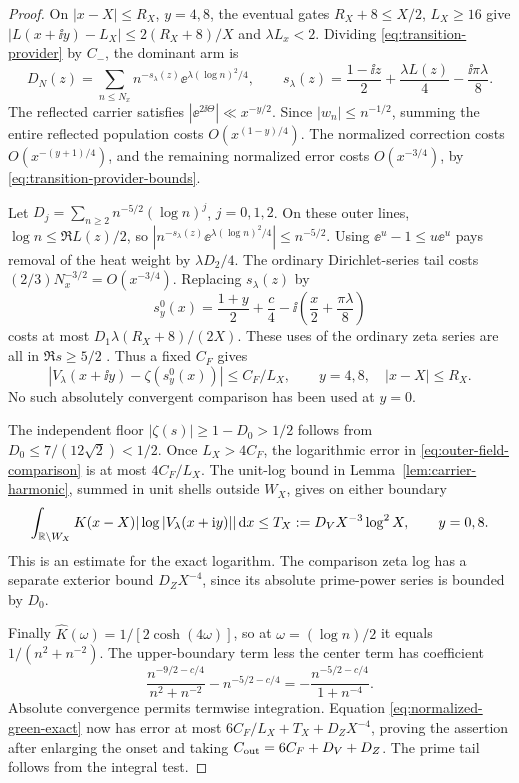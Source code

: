 \begin{proof}
On \(|x-X|\le R_X\), \(y=4,8\), the eventual gates
\(R_X+8\le X/2\), \(L_X\ge16\) give
\(|L(x+\ii y)-L_X|\le2(R_X+8)/X\) and \(\lambda L_x<2\).
Dividing \eqref{eq:transition-provider} by \(C_-\), the dominant arm is
\[
 D_N(z)=\sum_{n\le N_x}n^{-s_\lambda(z)}
                         \ee^{\lambda(\log n)^2/4},\qquad
 s_\lambda(z)=\frac{1-\ii z}{2}+\frac{\lambda L(z)}4
                               -\frac{\ii\pi\lambda}{8}.
\]
The reflected carrier satisfies \(|\ee^{2\ii\Theta}|\ll x^{-y/2}\).
Since \(|w_n|\le n^{-1/2}\), summing the entire reflected population
costs \(O(x^{(1-y)/4})\). The normalized correction costs
\(O(x^{-(y+1)/4})\), and the remaining normalized error costs
\(O(x^{-3/4})\), by \eqref{eq:transition-provider-bounds}.

Let \(D_j=\sum_{n\ge2}n^{-5/2}(\log n)^j\), \(j=0,1,2\).
On these outer lines, \(\log n\le\Re L(z)/2\), so
\(|n^{-s_\lambda(z)}\ee^{\lambda(\log n)^2/4}|\le n^{-5/2}\).
Using \(\ee^u-1\le u\ee^u\) pays removal of the heat weight by
\(\lambda D_2/4\). The ordinary Dirichlet-series tail costs
\((2/3)N_x^{-3/2}=O(x^{-3/4})\). Replacing \(s_\lambda(z)\) by
\[
 s_y^0(x)=\frac{1+y}{2}+\frac c4
                   -\ii\left(\frac x2+\frac{\pi\lambda}{8}\right)
\]
costs at most \(D_1\lambda(R_X+8)/(2X)\). These uses of the
ordinary zeta series are all in \(\Re s\ge5/2\)
\cite{DLMFZetaOuter2026}. Thus a fixed \(C_F\) gives
\begin{equation}\label{eq:outer-field-comparison}
 |V_\lambda(x+\ii y)-\zeta(s_y^0(x))|\le C_F/L_X,
 \qquad y=4,8,\quad |x-X|\le R_X.
\end{equation}
No such absolutely convergent comparison has been used at \(y=0\).

The independent floor
\(|\zeta(s)|\ge1-D_0>1/2\) follows from
\(D_0\le7/(12\sqrt2)<1/2\). Once \(L_X>4C_F\), the logarithmic
error in \eqref{eq:outer-field-comparison} is at most \(4C_F/L_X\).
The unit-log bound in Lemma~\ref{lem:carrier-harmonic}, summed in
unit shells outside \(W_X\), gives on either boundary
\begin{equation}\label{eq:transition-log-tail}
 \int_{\mathbb R\setminus W_X}K(x-X)|\log|V_\lambda(x+\mathrm i y)||\,\mathrm d x
 \le T_X:=D_VX^{-3}\log^2X,\qquad y=0,8.
\end{equation}
This is an estimate for the exact logarithm. The comparison zeta log
has a separate exterior bound \(D_ZX^{-4}\), since its absolute
prime-power series is bounded by \(D_0\).

Finally \(\widehat K(\omega)=1/[2\cosh(4\omega)]\), so at
\(\omega=(\log n)/2\) it equals \(1/(n^2+n^{-2})\).
The upper-boundary term less the center term has coefficient
\[
 \frac{n^{-9/2-c/4}}{n^2+n^{-2}}-n^{-5/2-c/4}
       =-\frac{n^{-5/2-c/4}}{1+n^{-4}}.
\]
Absolute convergence permits termwise integration. Equation
\eqref{eq:normalized-green-exact} now has error at most
\(6C_F/L_X+T_X+D_ZX^{-4}\), proving the assertion after enlarging
the onset and taking \(C_{\rm out}=6C_F+D_V+D_Z\).
The prime tail follows from the integral test.
\end{proof}

